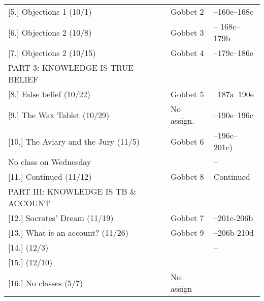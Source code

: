 \documentclass[article,oneside]{memoir}
\begin{document}
\begin{center}
\begin{longtable}{p{4.5cm}p{2cm}p{6cm}}
[5.] Objections 1  (10/1)				& Gobbet 2		& --160e--168c \\ [1.8\baselineskip]


[6.] Objections 2 (10/8)				& Gobbet 3		 & -- 168c--179b \\[1.8\baselineskip]


[7.] Objections 2 (10/15)	   			& Gobbet 4		 & --179c--186e    \\[1.8\baselineskip]

								
PART 3: KNOWLEDGE IS TRUE BELIEF					& 				 &    \\ [1.8\baselineskip]									
  
[8.] False belief (10/22)			 	& Gobbet 5		& --187a--190e  \\[1.8\baselineskip]


[9.] The Wax Tablet	(10/29)			& No assign.		& --190e--196c\\[1.8\baselineskip]

[10.] The Aviary and the Jury	(11/5)	& Gobbet 6		& --196c--201c) \\[1.8\baselineskip]
No class on Wednesday			    					& 				& -- \\ [1.8\baselineskip]

[11.] Continued (11/12)				& Gobbet 8		& Continued \\ [1.8\baselineskip]

							
PART III: KNOWLEDGE IS TB \& ACCOUNT				& 				 & 	\\ [1.8\baselineskip]


[12.] Socrates' Dream (11/19)			& Gobbet 7		& --201c-206b \\
						
[13.] What is an account? (11/26)	      	& Gobbet 9		&  --206b-210d \\ [1.8\baselineskip]

						 
[14.]  (12/3)	    					& 			& --\\
			      				
[15.] 	(12/10)			  			& 			&-- \\ 


[16.] No classes (5/7)		    		& No. assign			& \\ 



\end{longtable}
\end{center}



\end{document}
